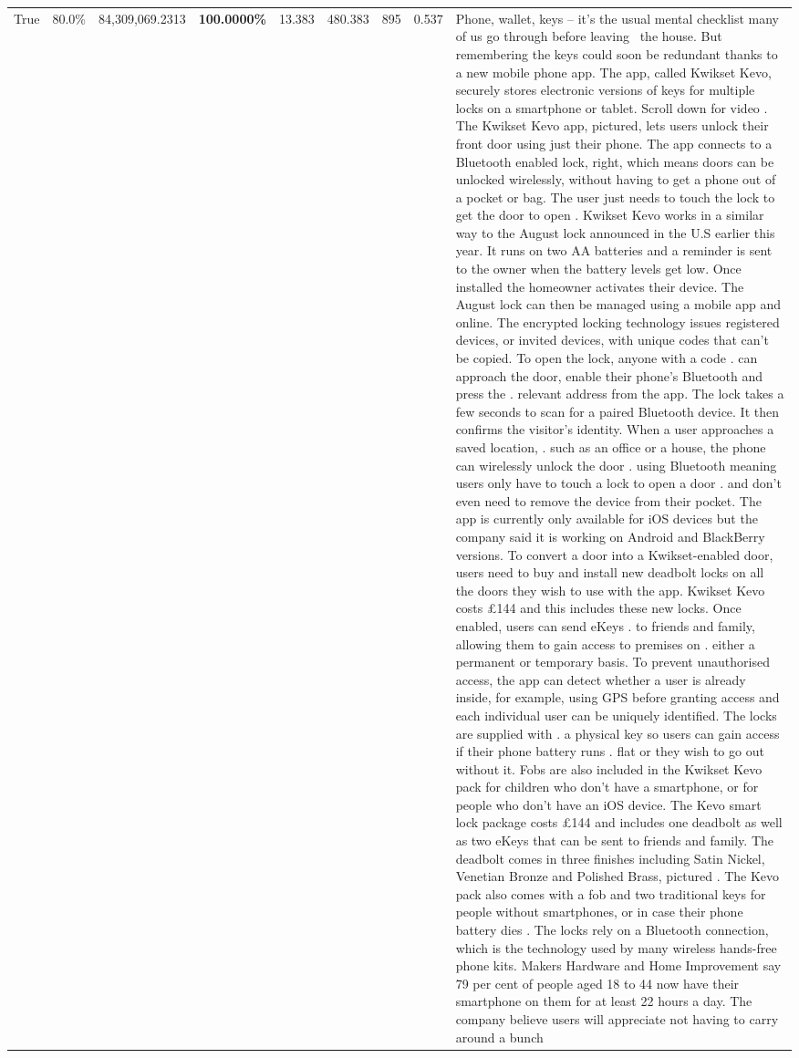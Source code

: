 \begin{table}[H]
\begin{tabular}{lllrlllll}
True & 80.0\% & 84,309,069.2313 & \bfseries \color{red} 100.0000\% & 13.383 & 480.383 & 895 & 0.537 & Phone, wallet, keys – it’s the usual mental checklist many of us go through before leaving  the house. But remembering the keys could soon be redundant thanks to a new mobile phone app. The app, called Kwikset Kevo, securely stores electronic versions of keys for multiple locks on a smartphone or tablet. Scroll down for video . The Kwikset Kevo app, pictured, lets users unlock their front door using just their phone. The app connects to a Bluetooth enabled lock, right, which means doors can be unlocked wirelessly, without having to get a phone out of a pocket or bag. The user just needs to touch the lock to get the door to open . Kwikset Kevo works in a similar way to the August lock announced in the U.S earlier this year. It runs on two AA batteries and a reminder is sent to the owner when the battery levels get low. Once installed the homeowner activates their device. The August lock can then be managed using a mobile app and online. The encrypted locking technology issues registered devices, or invited devices, with unique codes that can't be copied. To open the lock, anyone with a code . can approach the door, enable their phone's Bluetooth and press the . relevant address from the app. The lock takes a few seconds to scan for a paired Bluetooth device. It then confirms the visitor's identity. When a user approaches a saved location, . such as an office or a house, the phone can wirelessly unlock the door . using Bluetooth meaning users only have to touch a lock to open a door . and don't even need to remove the device from their pocket. The app is currently only available for iOS devices but the company said it is working on Android and BlackBerry versions. To convert a door into a Kwikset-enabled door, users need to buy and install new deadbolt locks on all the doors they wish to use with the app. Kwikset Kevo costs £144 and this includes these new locks. Once enabled, users can send eKeys . to friends and family, allowing them to gain access to premises on . either a permanent or temporary basis. To prevent unauthorised access, the app can detect whether a user is already inside, for example, using GPS before granting access and each individual user can be uniquely identified. The locks are supplied with . a physical key so users can gain access if their phone battery runs . flat or they wish to go out without it. Fobs are also included in the Kwikset Kevo pack for children who don't have a smartphone, or for people who don't have an iOS device. The Kevo smart lock package costs £144 and includes one deadbolt as well as two eKeys that can be sent to friends and family. The deadbolt comes in three finishes including Satin Nickel, Venetian Bronze and Polished Brass, pictured . The Kevo pack also comes with a fob and two traditional keys for people without smartphones, or in case their phone battery dies . The locks rely on a Bluetooth connection, which is the technology used by many wireless hands-free phone kits. Makers Hardware and Home Improvement say 79 per cent of people aged 18 to 44 now have their smartphone on them for at least 22 hours a day. The company believe users will appreciate not having to carry around a bunch 
\end{tabular}
\end{table}
